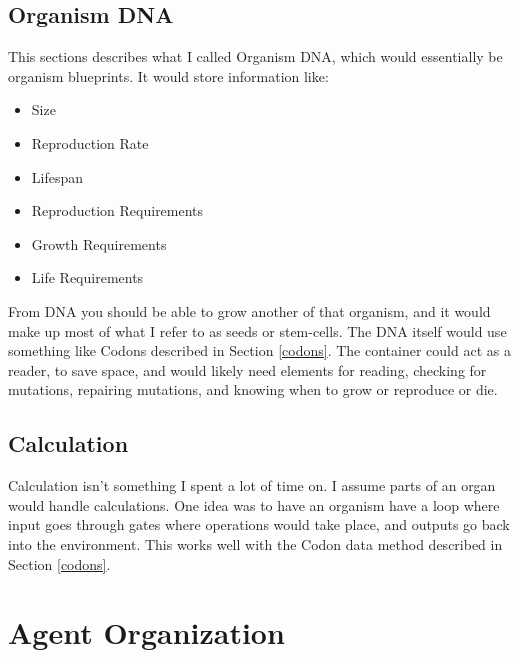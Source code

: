 \documentclass[article,12pt,oneside]{memoir}
\begin{document}
\section{Organism DNA}

This sections describes what I called Organism DNA, which would essentially be organism blueprints.
It would store information like:

\begin{itemize}
	\item Size
	\item Reproduction Rate
	\item Lifespan
	\item Reproduction Requirements
	\item Growth Requirements
	\item Life Requirements
\end{itemize}

From DNA you should be able to grow another of that organism, and it would make up most of what I refer to as seeds or stem-cells.
The DNA itself would use something like Codons described in Section \ref{codons}.
The container could act as a reader, to save space, and would likely need elements for reading, checking for mutations, repairing mutations, and knowing when to grow or reproduce or die.

\section{Calculation}

Calculation isn't something I spent a lot of time on.
I assume parts of an organ would handle calculations.
One idea was to have an organism have a loop where input goes through gates where operations would take place, and outputs go back into the environment.
This works well with the Codon data method described in Section \ref{codons}.



\pagebreak
\chapter{Agent Organization}
\end{document}
